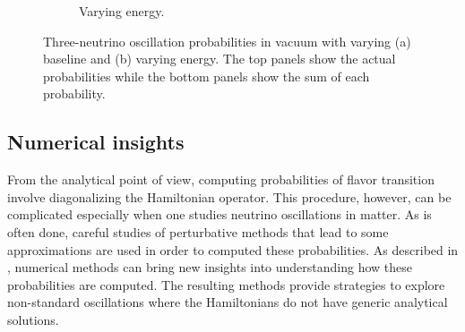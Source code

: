 \documentclass[twocolumn,secnumarabic,amssymb, nobibnotes, aps, prd,10pt]{revtex4-1}
\begin{document}
\begin{figure}
\begin{subfigure}{1.05\linewidth}
\caption{Varying energy.} 
\label{fig:vacuum} 
\end{subfigure}
\caption{Three-neutrino oscillation probabilities in vacuum with varying (a) baseline
and (b) varying energy. The top panels show the actual probabilities while the bottom
panels show the sum of each probability.}
\end{figure}

\subsection{Numerical insights}
\label{subsec:numerical}

From the analytical point of view, computing probabilities of flavor transition involve
diagonalizing the Hamiltonian operator. This procedure, however, can be complicated especially
when one studies neutrino oscillations in matter. As is often done, careful studies of
perturbative methods that lead to some approximations are used in order to computed these
probabilities. As described in \cite{}, numerical methods can bring new insights into 
understanding how these probabilities are computed. The resulting methods provide strategies
to explore non-standard oscillations where the Hamiltonians do not have generic analytical
solutions. 
\end{document}
